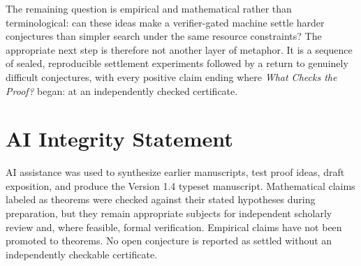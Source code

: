 \documentclass[11pt]{article}
\theoremstyle{definition}
\theoremstyle{remark}
\begin{document}
The remaining question is empirical and mathematical rather than terminological: can these ideas make a verifier-gated machine settle harder conjectures than simpler search under the same resource constraints? The appropriate next step is therefore not another layer of metaphor. It is a sequence of sealed, reproducible settlement experiments followed by a return to genuinely difficult conjectures, with every positive claim ending where \emph{What Checks the Proof?} began: at an independently checked certificate.

\section*{AI Integrity Statement}
AI assistance was used to synthesize earlier manuscripts, test proof ideas, draft exposition, and produce the Version 1.4 typeset manuscript. Mathematical claims labeled as theorems were checked against their stated hypotheses during preparation, but they remain appropriate subjects for independent scholarly review and, where feasible, formal verification. Empirical claims have not been promoted to theorems. No open conjecture is reported as settled without an independently checkable certificate.
\end{document}
